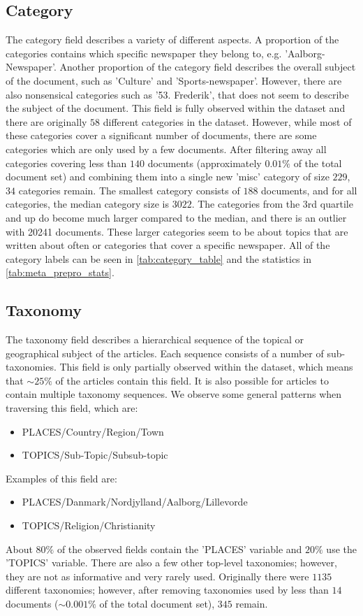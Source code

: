 \subsection{Category}
The category field describes a variety of different aspects.
A proportion of the categories contains which specific newspaper they belong to, e.g. 'Aalborg-Newspaper'.
Another proportion of the category field describes the overall subject of the document, such as 'Culture' and 'Sports-newspaper'.
However, there are also nonsensical categories such as '53. Frederik', that does not seem to describe the subject of the document.
This field is fully observed within the dataset and there are originally $58$ different categories in the dataset.
However, while most of these categories cover a significant number of documents, there are some categories which are only used by a few documents.
After filtering away all categories covering less than $140$ documents (approximately $0.01\%$ of the total document set) and combining them into a single new 'misc' category of size $229$, $34$ categories remain.
The smallest category consists of $188$ documents, and for all categories, the median category size is $3022$.
The categories from the 3rd quartile and up do become much larger compared to the median, and there is an outlier with 20241 documents.
These larger categories seem to be about topics that are written about often or categories that cover a specific newspaper.
All of the category labels can be seen in \autoref{tab:category_table} and the statistics in \autoref{tab:meta_prepro_stats}.

\subsection{Taxonomy}\label{sec:dataset_taxonomy}
The taxonomy field describes a hierarchical sequence of the topical or geographical subject of the articles.
Each sequence consists of a number of sub-taxonomies.
This field is only partially observed within the dataset, which means that ${\sim}25\%$ of the articles contain this field.
It is also possible for articles to contain multiple taxonomy sequences.
We observe some general patterns when traversing this field, which are:
\begin{itemize}
	\item PLACES/Country/Region/Town
	\item TOPICS/Sub-Topic/Subsub-topic
\end{itemize}
Examples of this field are:
\begin{itemize}
	\item PLACES/Danmark/Nordjylland/Aalborg/Lillevorde
	\item TOPICS/Religion/Christianity
\end{itemize}
About $80\%$ of the observed fields contain the 'PLACES' variable and $20\%$ use the 'TOPICS' variable.
There are also a few other top-level taxonomies; however, they are not as informative and very rarely used.
Originally there were $1135$ different taxonomies; however, after removing taxonomies used by less than $14$ documents (${\sim}0.001\%$ of the total document set), $345$ remain.

